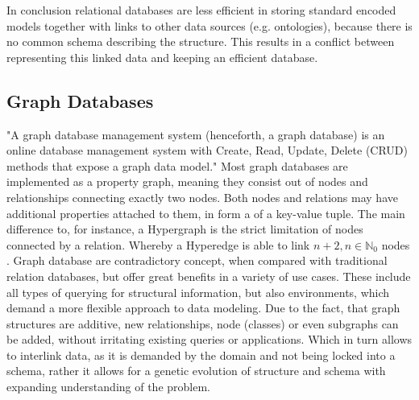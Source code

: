 In conclusion relational databases are less efficient in storing standard encoded models together with links to other data sources (e.g. ontologies), because there is no common schema describing the structure. This results in a conflict between representing this linked data and keeping an efficient database. \citep{Henkel2015}

\subsection{Graph Databases}
\label{sec:background:graph-db:neo4j}
"A graph database management system (henceforth, a graph database) is an online database management system with Create, Read, Update, Delete (CRUD) methods that expose a graph data model." \citep{Robinson2013}
Most graph databases are implemented as a property graph, meaning they consist out of nodes and relationships connecting exactly two nodes. Both nodes and relations may have additional properties attached to them, in form a of a key-value tuple.
The main difference to, for instance, a Hypergraph is the strict limitation of nodes connected by a relation. Whereby a Hyperedge is able to link $n+2, n \in \mathbb{N}_0$ nodes \citep[Appendix A]{Robinson2013}.
Graph database are contradictory concept, when compared with traditional relation databases, but offer great benefits in a variety of use cases. These include all types of querying for structural information, but also environments, which demand a more flexible approach to data modeling. 
Due to the fact, that graph structures are additive, new relationships, node (classes) or even subgraphs can be added, without irritating existing queries or applications. Which in turn allows to interlink data, as it is demanded by the domain and not being locked into a schema, rather it allows for a genetic evolution of structure and schema with expanding understanding of the problem. \citep{Robinson2013}

